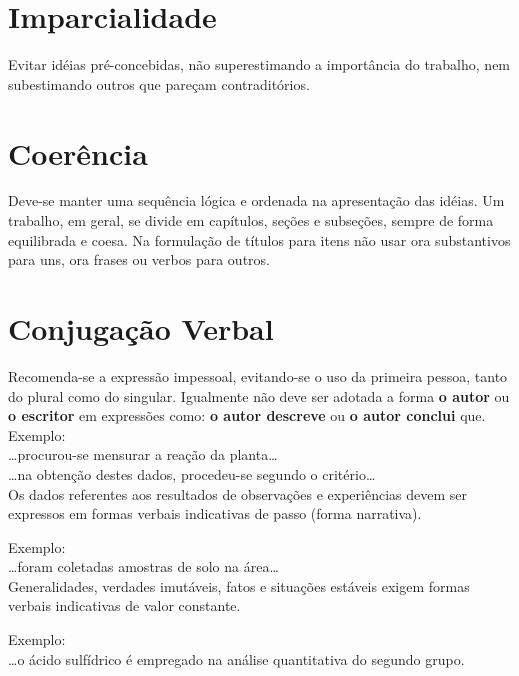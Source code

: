 \documentclass[repeatfields,xlists,xpacks,oneside,yearsonly]{ufrgscca}
\begin{document}
\begin{annex}
\section{Imparcialidade}

Evitar idéias pré-concebidas, não superestimando a importância do trabalho,
nem subestimando outros que pareçam contraditórios.

\section{Coerência}

Deve-se manter uma sequência lógica e ordenada na apresentação das idéias.
Um trabalho, em geral, se divide em capítulos, seções e subseções, sempre de
forma equilibrada e coesa. Na formulação de títulos para itens não usar ora
substantivos para uns, ora frases ou verbos para outros.

\section{Conjugação Verbal}

Recomenda-se a expressão impessoal, evitando-se o uso da primeira pessoa,
tanto do plural como do singular. Igualmente não deve ser adotada a forma
{\bf o autor} ou {\bf o escritor} em expressões como: {\bf o autor descreve}
ou {\bf o autor conclui} que.\\

Exemplo:\\

		\ldots procurou-se mensurar a reação da planta\ldots\\

		\ldots na obtenção destes dados, procedeu-se segundo o critério\ldots\\

Os dados  referentes aos resultados de observações e experiências devem ser
expressos em formas verbais indicativas de passo (forma narrativa).

Exemplo:\\

		\ldots foram coletadas amostras de solo na área\ldots\\

Generalidades, verdades imutáveis, fatos e situações estáveis exigem formas
verbais indicativas de valor constante.

Exemplo:\\

		\ldots o ácido sulfídrico é empregado na análise quantitativa do segundo grupo.\\


\end{annex}
\end{document}
